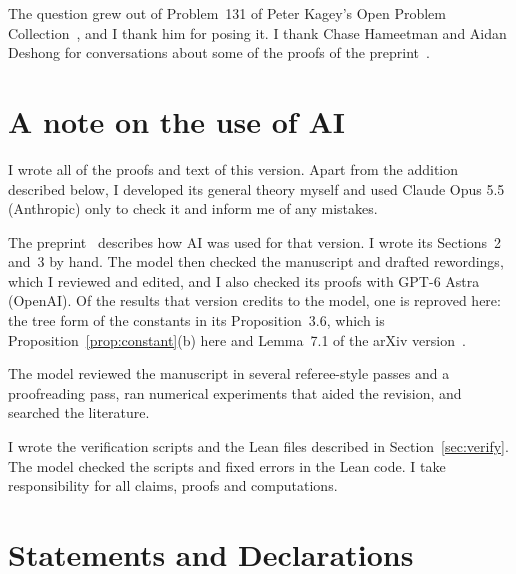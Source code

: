 \documentclass[pdflatex,sn-mathphys-num]{sn-jnl}%
\theoremstyle{thmstyleone}
\theoremstyle{thmstylethree}
\theoremstyle{thmstyletwo}
\newif\ifarxivbuild
\newcommand{\Bversion}{\ifarxivbuild the first version\else the preprint\fi}
\begin{document}








\setcounter{section}{8}


\backmatter

The question grew out of Problem~131 of Peter Kagey's Open Problem
Collection~\cite{kagey131}, and I thank him for posing it. I thank Chase
Hameetman and Aidan Deshong for conversations about some of the proofs of
\Bversion~\cite{paperB}.

\section*{A note on the use of AI}
I wrote all of the proofs and text of this version. Apart from the addition
described below, I developed its general theory myself and used Claude Opus 5.5
(Anthropic) only to check it and inform me of any mistakes.

The preprint~\cite{paperB} describes how AI was used for
that version. I wrote its Sections~2 and~3 by hand. The model then checked the
manuscript and drafted rewordings, which I reviewed and edited, and I also checked
its proofs with GPT-6 Astra (OpenAI). Of the results that version credits to the
model, one is reproved here: the tree form of the constants in its
Proposition~3.6, which is Proposition~\ref{prop:constant}(b) here and
Lemma~7.1 of the arXiv version~\cite{arxivC1}.

The model reviewed the manuscript in several referee-style
passes and a proofreading pass, ran numerical experiments that aided the
revision, and searched the literature.

I wrote the verification scripts and the Lean files described in
Section~\ref{sec:verify}. The model checked the scripts and fixed errors in the
Lean code. I take responsibility for all claims, proofs and computations.

\section*{Statements and Declarations}
\end{document}
